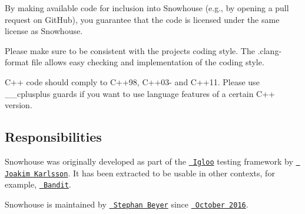 By making available code for inclusion into Snowhouse (e.\+g., by opening a pull request on Git\+Hub), you guarantee that the code is licensed under the same license as Snowhouse.

Please make sure to be consistent with the project\textquotesingle{}s coding style. The {\ttfamily .clang-\/format} file allows easy checking and implementation of the coding style.

C++ code should comply to C++98, C++03-\/ and C++11. Please use {\ttfamily \+\_\+\+\_\+cplusplus} guards if you want to use language features of a certain C++ version.

\subsection*{Responsibilities}

Snowhouse was originally developed as part of the \href{//github.com/joakimkarlsson/igloo}{\texttt{ Igloo}} testing framework by \href{//github.com/joakimkarlsson}{\texttt{ Joakim Karlsson}}. It has been extracted to be usable in other contexts, for example, \href{//github.com/banditcpp/bandit}{\texttt{ Bandit}}.

Snowhouse is maintained by \href{//github.com/sbeyer}{\texttt{ Stephan Beyer}} since \href{//twitter.com/JHKarlsson/status/789332548799332352}{\texttt{ October 2016}}. 